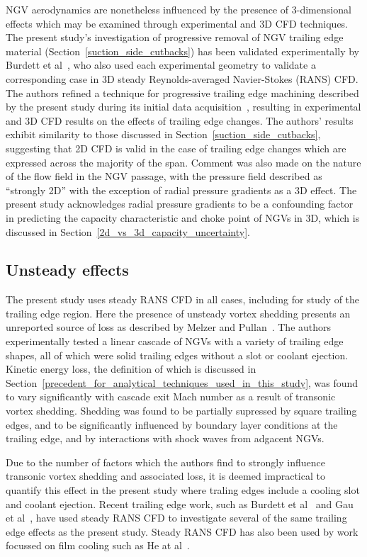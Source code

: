 \documentclass[a4paper, 11pt, oneside]{report}
\begin{document}
NGV aerodynamics are nonetheless influenced by the presence of 3-dimensional effects which may be examined through experimental and 3D CFD techniques. The present study's investigation of progressive removal of NGV trailing edge material (Section~\ref{suction_side_cutbacks}) has been validated experimentally by Burdett et al~\cite{burdett_capacity}, who also used each experimental geometry to validate a corresponding case in 3D steady Reynolds-averaged Navier-Stokes (RANS) CFD. The authors refined a technique for progressive trailing edge machining described by the present study during its initial data acquisition~\cite{gammage_trailing_edge_machining}, resulting in experimental and 3D CFD results on the effects of trailing edge changes. The authors' results exhibit similarity to those discussed in Section~\ref{suction_side_cutbacks}, suggesting that 2D CFD is valid in the case of trailing edge changes which are expressed across the majority of the span. Comment was also made on the nature of the flow field in the NGV passage, with the pressure field described as ``strongly 2D'' with the exception of radial pressure gradients as a 3D effect. The present study acknowledges radial pressure gradients to be a confounding factor in predicting the capacity characteristic and choke point of NGVs in 3D, which is discussed in Section~\ref{2d_vs_3d_capacity_uncertainty}.

\subsection{Unsteady effects}

The present study uses steady RANS CFD in all cases, including for study of the trailing edge region. Here the presence of unsteady vortex shedding presents an unreported source of loss as described by Melzer and Pullan~\cite{melzer_vortex_shedding}. The authors experimentally tested a linear cascade of NGVs with a variety of trailing edge shapes, all of which were solid trailing edges without a slot or coolant ejection. Kinetic energy loss, the definition of which is discussed in Section~\ref{precedent_for_analytical_techniques_used_in_this_study}, was found to vary significantly with cascade exit Mach number as a result of transonic vortex shedding. Shedding was found to be partially supressed by square trailing edges, and to be significantly influenced by boundary layer conditions at the trailing edge, and by interactions with shock waves from adgacent NGVs. 

Due to the number of factors which the authors find to strongly influence transonic vortex shedding and associated loss, it is deemed impractical to quantify this effect in the present study where traling edges include a cooling slot and coolant ejection. Recent trailing edge work, such as Burdett et al~\cite{burdett_capacity} and Gau et al~\cite{gau_te}, have used steady RANS CFD to investigate several of the same trailing edge effects as the present study. Steady RANS CFD has also been used by work focussed on film cooling such as He at al~\cite{he_film_cooling}.
\end{document}
